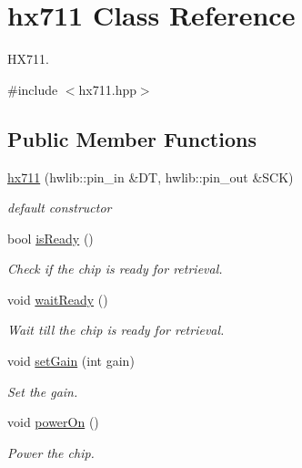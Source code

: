 \hypertarget{classhx711}{}\section{hx711 Class Reference}
\label{classhx711}


H\+X711.  




{\ttfamily \#include $<$hx711.\+hpp$>$}

\subsection*{Public Member Functions}
\begin{DoxyCompactItemize}
\item 
\hyperlink{classhx711_a6665f2fb7a4d9e98662c24ede7c5ddab}{hx711} (hwlib\+::pin\+\_\+in \&DT, hwlib\+::pin\+\_\+out \&S\+CK)
\begin{DoxyCompactList}\small\item\em default constructor \end{DoxyCompactList}\item 
bool \hyperlink{classhx711_a2adbffceb80c1db7f8af74258df7c2fc}{is\+Ready} ()
\begin{DoxyCompactList}\small\item\em Check if the chip is ready for retrieval. \end{DoxyCompactList}\item 
\mbox{\label{classhx711_abb10f4013105b960ce07e52d6cefea06}} 
void \hyperlink{classhx711_abb10f4013105b960ce07e52d6cefea06}{wait\+Ready} ()
\begin{DoxyCompactList}\small\item\em Wait till the chip is ready for retrieval. \end{DoxyCompactList}\item 
void \hyperlink{classhx711_aeaaa5d42da78c5db98f98ce3f6e6cc55}{set\+Gain} (int gain)
\begin{DoxyCompactList}\small\item\em Set the gain. \end{DoxyCompactList}\item 
void \hyperlink{classhx711_aab22b06484907dc75d4115e7065977c0}{power\+On} ()
\begin{DoxyCompactList}\small\item\em Power the chip. \end{DoxyCompactList}\item 

\end{DoxyCompactItemize}
